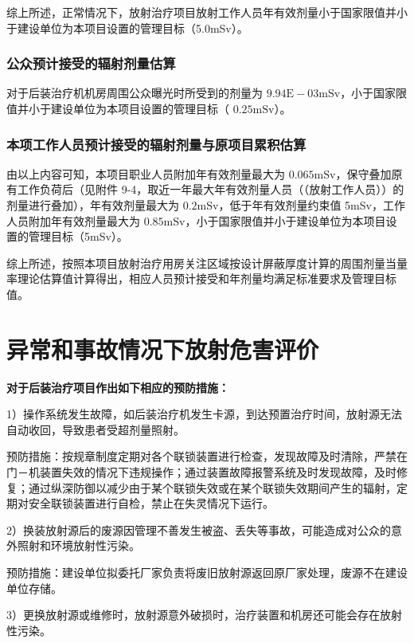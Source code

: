 综上所述，正常情况下，放射治疗项目放射工作人员年有效剂量小于国家限值并小于建设单位为本项目设置的管理目标（5.0mSv）。

\subsubsection{公众预计接受的辐射剂量估算}

对于后装治疗机机房周围公众曝光时所受到的剂量为 $9 . 9 4 \mathrm { E } { - } 0 3 \mathrm { m S v }$，小于国家限值并小于建设单位为本项目设置的管理目标（ $0 . 2 5 \mathrm { m S v }$）。

\subsubsection{本项工作人员预计接受的辐射剂量与原项目累积估算}

由以上内容可知，本项目职业人员附加年有效剂量最大为 $0 . 0 6 5 \mathrm { m S v }$，保守叠加原有工作负荷后（见附件 9-4，取近一年最大年有效剂量人员（（放射工作人员））的剂量进行叠加），年有效剂量最大为 $0 . 2 \mathrm { m S v }$，低于年有效剂量约束值 5mSv，工作人员附加年有效剂量最大为 $0 . 8 5 \mathrm { m S v }$，小于国家限值并小于建设单位为本项目设置的管理目标（5mSv）。

综上所述，按照本项目放射治疗用房关注区域按设计屏蔽厚度计算的周围剂量当量率理论估算值计算得出，相应人员预计接受和年剂量均满足标准要求及管理目标值。

\section{异常和事故情况下放射危害评价}

\textbf{对于后装治疗项目作出如下相应的预防措施：}

1）操作系统发生故障，如后装治疗机发生卡源，到达预置治疗时间，放射源无法自动收回，导致患者受超剂量照射。

预防措施：按规章制度定期对各个联锁装置进行检查，发现故障及时清除，严禁在门－机装置失效的情况下违规操作；通过装置故障报警系统及时发现故障，及时修复；通过纵深防御以减少由于某个联锁失效或在某个联锁失效期间产生的辐射，定期对安全联锁装置进行自检，禁止在失灵情况下运行。

2）换装放射源后的废源因管理不善发生被盗、丢失等事故，可能造成对公众的意外照射和环境放射性污染。

预防措施：建设单位拟委托厂家负责将废旧放射源返回原厂家处理，废源不在建设单位存储。

3）更换放射源或维修时，放射源意外破损时，治疗装置和机房还可能会存在放射性污染。

